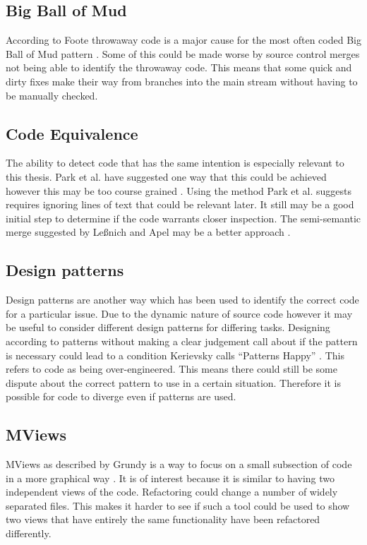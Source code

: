 \documentclass[12pt]{CRPITStyle}
\renewcommand{\cite}{\citep}
\begin{document}
\subsection{Big Ball of Mud}
According to Foote throwaway code is a major cause for the most often coded Big Ball of Mud pattern \cite{Foote1997}. Some of this could be made worse by source control merges not being able to identify the throwaway code. This means that some quick and dirty fixes make their way from branches into the main stream without having to be manually checked.
\subsection{Code Equivalence}
The ability to detect code that has the same intention is especially relevant to this thesis. Park et al. have suggested one way that this could be achieved however this may be too course grained \cite{Park2013}. Using the method Park et al. suggests requires ignoring lines of text that could be relevant later. It still may be a good initial step to determine if the code warrants closer inspection. The semi-semantic merge suggested by Le{\ss}nich and Apel may be a better approach \cite{LeBenich2012} \cite{Apel2011}.
\subsection{Design patterns}
Design patterns are another way which has been used to identify the correct code for a particular issue. Due to the dynamic nature of source code however it may be useful to consider different design patterns for differing tasks. Designing according to patterns without making a clear judgement call about if the pattern is necessary could lead to a condition Kerievsky calls ``Patterns Happy'' \cite{Kerievsky2004}. This refers to code as being over-engineered. This means there could still be some dispute about the correct pattern to use in a certain situation. Therefore it is possible for code to diverge even if patterns are used.
\subsection{MViews}
MViews as described by Grundy is a way to focus on a small subsection of code in a more graphical way \cite{Grundya}. It is of interest because it is similar to having two independent views of the code. Refactoring could change a number of widely separated files. This makes it harder to see if such a tool could be used to show two views that have entirely the same functionality have been refactored differently. 
\end{document}
